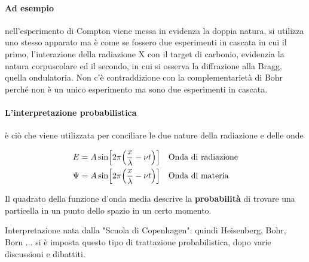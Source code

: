 \paragraph{Ad esempio} nell'esperimento di Compton viene messa in evidenza la doppia natura, si utilizza uno stesso apparato ma è come se fossero due esperimenti in cascata in cui il primo, l'interazione della radiazione X con il target di carbonio, evidenzia la natura corpuscolare ed il secondo, in cui si osserva la diffrazione alla Bragg, quella ondulatoria.
Non c'è contraddizione con la complementarietà di Bohr perché non è un unico esperimento ma sono due esperimenti in cascata.


\paragraph{L'interpretazione probabilistica} è ciò che viene utilizzata per conciliare le due nature della radiazione e delle onde

\begin{equation}
\begin{split}
E & = A \sin \Bigl[ 2\pi \Bigl(  \frac{ x}{\lambda } - \nu t  \Bigr) \Bigr] \quad \mbox{Onda di radiazione} \\
\Psi & = A \sin \Bigl[ 2\pi \Bigl(  \frac{ x}{\lambda } - \nu t  \Bigr) \Bigr] \quad \mbox{Onda di materia}
\end{split}
\end{equation}

Il quadrato della funzione d'onda media descrive la \textbf{probabilità} di trovare una particella in un punto dello spazio in un certo momento.

Interpretazione nata dalla "Scuola di Copenhagen": quindi Heisenberg, Bohr, Born ...
si è imposta questo tipo di trattazione probabilistica, dopo varie discussioni e dibattiti.


 








